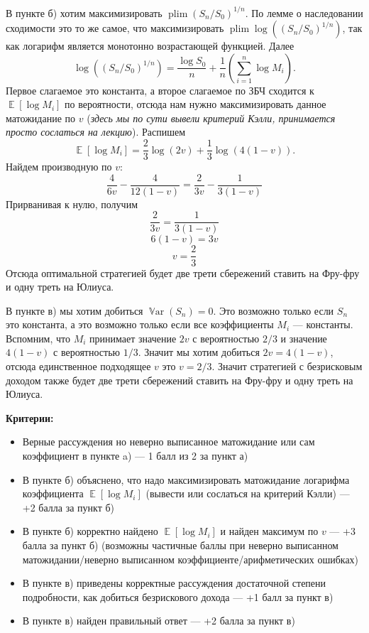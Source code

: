 \documentclass[12pt]{article}
\DeclareMathOperator{\Var}{\mathbb{V}ar}
\DeclareMathOperator{\E}{\mathbb{E}}
\DeclareMathOperator{\plim}{plim}
\begin{document}
\begin{enumerate}
\vspace{0.3cm}

В пункте б) хотим максимизировать $\plim(S_n / S_0)^{1/n}$. По лемме о наследовании сходимости это то же самое, что максимизировать $\plim\log \left((S_n / S_0)^{1/n}\right)$, так как логарифм является монотонно возрастающей функцией. Далее
\[
\log \left((S_n / S_0)^{1/n}\right) = \frac{\log S_0}{n} + \frac{1}{n}\left( \sum_{i=1}^n \log M_i\right).
\]
Первое слагаемое это константа, а второе слагаемое по ЗБЧ сходится к $\E\left[ \log M_i\right]$ по вероятности, отсюда нам нужно максимизировать данное матожидание по $v$ (\textit{здесь мы по сути вывели критерий Кэлли, принимается просто сослаться на лекцию}). Распишем
\[
\E\left[\log M_i\right] = \frac{2}{3}\log(2v) + \frac{1}{3}\log(4(1 - v)).
\]
Найдем производную по $v$:
\[
\frac{4}{6v} - \frac{4}{12(1-v)} = \frac{2}{3v} - \frac{1}{3(1-v)}
\]
Прирванивая к нулю, получим
\[
\frac{2}{3v} = \frac{1}{3(1-v)}
\]
\[
6(1-v) = 3v
\]
\[
v = \frac{2}{3}
\]
Отсюда оптимальной стратегией будет две трети сбережений ставить на Фру-фру и одну треть на Юлиуса.

\vspace{0.3cm}

В пункте в) мы хотим добиться $\Var(S_n) = 0$. Это возможно только если $S_n$ это константа, а это возможно только если все коэффициенты $M_i$ — константы. Вспомним, что $M_i$ принимает значение $2v$ с вероятностью $2/3$ и значение $4(1-v)$ с вероятностью $1/3$. Значит мы хотим добиться $2v = 4(1 - v)$, отсюда единственное подходящее $v$ это $v = 2/3$. Значит стратегией с безрисковым доходом также будет две трети сбережений ставить на Фру-фру и одну треть на Юлиуса.

\vspace{0.3cm}

\textbf{Критерии:}

\begin{itemize}
    \item Верные рассуждения но неверно выписанное матожидание или сам коэффициент в пункте a) — 1 балл из 2 за пункт а)
    \item В пункте б) объяснено, что надо максимизировать матожидание логарифма коэффициента $\E[\log M_i]$ (вывести или сослаться на критерий Кэлли) — +2 балла за пункт б)
    \item В пункте б) корректно найдено $\E[\log M_i]$ и найден максимум по $v$ — +3 балла за пункт б) (возможны частичные баллы при неверно выписанном матожидании/неверно выписанном коэффициенте/арифметических ошибках)
    \item В пункте в) приведены корректные рассуждения достаточной степени подробности, как добиться безрискового дохода — +1 балл за пункт в) 
    \item В пункте в) найден правильный ответ — +2 балла за пункт в) 
\end{itemize}




\end{enumerate}
    
\end{document}
